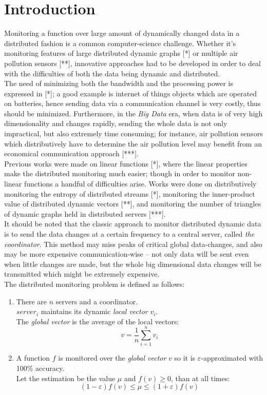 \documentclass[10pt, conference]{IEEEtran}
\begin{document}
\section{Introduction}
Monitoring a function over large amount of dynamically changed data in a distributed fashion is a common computer-science challenge. Whether it's monitoring features of large distributed dynamic graphs [*] or multiple air pollution sensors [**], innovative approaches had to be developed in order to deal with the difficulties of both the data being dynamic and distributed. \\
The need of minimizing both the bandwidth and the processing power is expressed in [*]; a good example is internet of things objects which are operated on batteries, hence sending data via a communication channel is very costly, thus should be minimized. Furthermore, in the \textit{Big Data} era, when data is of very high dimensionality and changes rapidly, sending the whole data is not only impractical, but also extremely time consuming; for instance, air pollution sensors which distributively have to determine the air pollution level may benefit from an economical communication approach [***]. \\
Previous works were made on linear functions [*], where the linear properties make the distributed monitoring much easier; though in order to monitor non-linear functions a handful of difficulties arise. Works were done on distributively monitoring the entropy of distributed streams [*], monitoring the inner-product value of distributed dynamic vectors [**], and monitoring the number of triangles of dynamic graphs held in distributed servers [***]. \\
It should be noted that the classic approach to monitor distributed dynamic data is to send the data changes at a certain frequency  to a central server, called \textit{the coordinator}. This method may miss peaks of critical global data-changes, and also may be more expensive communication-wise -- not only data will be sent even when little changes are made, but the whole big dimensional data changes will be transmitted which might be extremely expensive. \\
The distributed monitoring problem is defined as follows:
\begin{enumerate}
\item There are $n$ servers and a coordinator. \\ $server_i$ maintains its dynamic \textit{local vector} $v_i$. \\ The \textit{global vector} is the average of the local vectors: $$v = \frac{1}{n}\sum\limits_{i=1}^n {v_i}$$
\item A function $f$ is monitored over the \textit{global vector} $v$ so it is $\varepsilon$-approximated with 100\% accuracy. \\ Let the estimation  be the value $\mu$ and ${f(v) \geq 0}$, than at all times: $$(1-\varepsilon )f(v) \leq \mu \leq (1+\varepsilon )f(v)$$
\end{enumerate}
\end{document}
